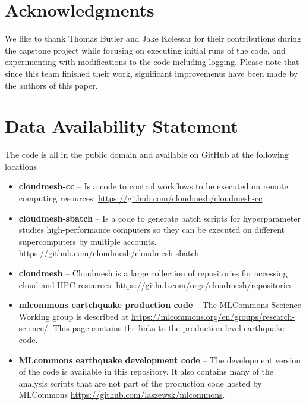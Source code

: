 \documentclass[utf8]{FrontiersinVancouver} %
\begin{document}
\section*{Acknowledgments}

We like to thank Thomas Butler and Jake Kolessar for their
contributions during the capstone project while focusing on executing
initial runs of the code, and experimenting with modifications to the
code including logging. Please note that since this team finished
their work, significant improvements have been made by the authors of
this paper.

\section*{Data Availability Statement}

The code is all in the public domain and available on GitHub at the following locations

\begin{itemize}

\item {\bf cloudmesh-cc} -- Is a code to control workflows to be executed on
  remote computing
  resources. \url{https://github.com/cloudmesh/cloudmesh-cc}

\item {\bf cloudmesh-sbatch} -- Is a code to generate batch scripts for
  hyperparameter studies high-performance computers so they can be
  executed on different supercomputers by multiple
  accounts. \url{https://github.com/cloudmesh/cloudmesh-sbatch}

\item {\bf cloudmesh} -- Cloudmesh is a large collection of repositories for
  accessing cloud and HPC
  resources. \url{https://github.com/orgs/cloudmesh/repositories}

\item {\bf mlcommons eartchquake production code} -- The MLCommons Sceience
  Working group is described at
  \url{https://mlcommons.org/en/groups/research-science/}. This page
  contains the links to the production-level earthquake code.

\item {\bf MLcommons earthquake development code} -- The development version of
  the code is available in this repository. It also contains many of
  the analysis scripts that are not part of the production code
  hosted by MLCommons \url{https://github.com/laszewsk/mlcommons}.

\end{itemize}
\end{document}
